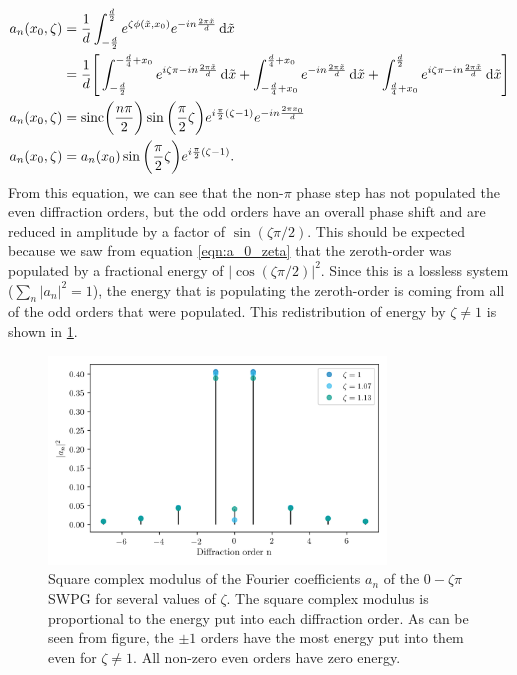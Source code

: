 \begin{equation}
\label{eqn:a_n_zeta}
	\begin{aligned}
	a_n(x_0,\zeta) &= \frac{1}{d}\int_{-\frac{d}{2}}^{\frac{d}{2}} e^{\zeta\phi(\tilde{x},x_0)}e^{-i n \frac{2\pi\tilde{x}}{d}}\mathop{}\!\mathrm{d}\tilde{x}\\
	&= \frac{1}{d}\Bigg[\int_{-\frac{d}{2}}^{-\frac{d}{4}+x_0}e^{i\zeta\pi-i n \frac{2\pi\tilde{x}}{d}} \mathop{}\!\mathrm{d}\tilde{x}
	+ \int_{-\frac{d}{4}+x_0}^{\frac{d}{4}+x_0}e^{-i n \frac{2\pi\tilde{x}}{d}} \mathop{}\!\mathrm{d}\tilde{x}
	+ \int_{\frac{d}{4}+x_0}^{\frac{d}{2}} e^{i\zeta\pi-i n \frac{2\pi\tilde{x}}{d}}\mathop{}\!\mathrm{d}\tilde{x} \Bigg]\\
	a_n(x_0, \zeta) & = \mathrm{sinc}\bigg(\frac{n\pi}{2}\bigg)\sin\bigg(\frac{\pi}{2}\zeta\bigg) e^{i\frac{\pi}{2} (\zeta - 1)} e^{-in\frac{2\pi x_0}{d}}\\
	a_n(x_0,\zeta) &= a_n(x_0)\sin\bigg(\frac{\pi}{2}\zeta\bigg)e^{i\frac{\pi}{2}(\zeta-1)}.
	\end{aligned}
\end{equation} 
From this equation, we can see that the non-$\pi$ phase step has not populated the even diffraction orders, but the odd orders have an overall phase shift and are reduced in amplitude by a factor of $\sin(\zeta\pi/2)$.  This should be expected because we saw from equation \ref{eqn:a_0_zeta} that the zeroth-order was populated by a fractional energy of $\rvert \cos(\zeta\pi/2)\rvert^2$.  Since this is a lossless system ($\sum_{n}\rvert a_n\rvert^2 = 1$), the energy that is populating the zeroth-order is coming from all of the odd orders that were populated. This redistribution of energy by $\zeta\neq1$ is shown in \ref{fig:a_n_zeta}.

\begin{figure}
	\centering
	\includegraphics[width=0.8\textwidth]{figures/Two_source/a_n_zeta.png}
	\caption{Square complex modulus of the Fourier coefficients $a_n$ of the $0-\zeta\pi$ SWPG for several values of $\zeta$. The square complex modulus is proportional to the energy put into each diffraction order.  As can be seen from figure, the $\pm1$ orders have the most energy put into them even for $\zeta\neq 1$.  All non-zero even orders have zero energy.}
	\label{fig:a_n_zeta}
\end{figure}

